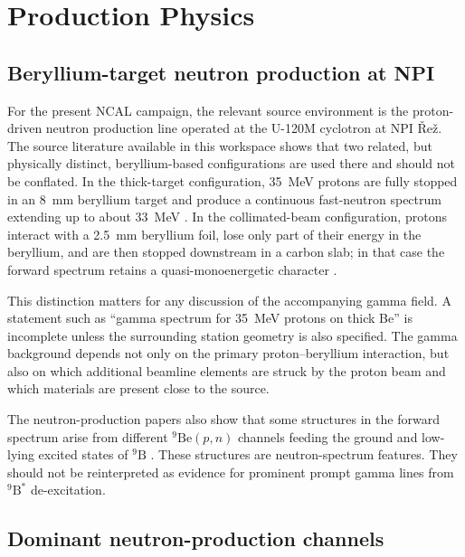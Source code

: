 \chapter{Production Physics}

\section{Beryllium-target neutron production at NPI}

For the present NCAL campaign, the relevant source environment is the proton-driven neutron production line operated at the U-120M cyclotron at NPI \v{R}e\v{z}. The source literature available in this workspace shows that two related, but physically distinct, beryllium-based configurations are used there and should not be conflated. In the thick-target configuration, \SI{35}{MeV} protons are fully stopped in an \SI{8}{mm} beryllium target and produce a continuous fast-neutron spectrum extending up to about \SI{33}{MeV} \citep{Majerle2023PBeGenerator}. In the collimated-beam configuration, protons interact with a \SI{2.5}{mm} beryllium foil, lose only part of their energy in the beryllium, and are then stopped downstream in a carbon slab; in that case the forward spectrum retains a quasi-monoenergetic character \citep{Ansorge2025CollimatedBeams}.

This distinction matters for any discussion of the accompanying gamma field. A statement such as ``gamma spectrum for \SI{35}{MeV} protons on thick Be'' is incomplete unless the surrounding station geometry is also specified. The gamma background depends not only on the primary proton--beryllium interaction, but also on which additional beamline elements are struck by the proton beam and which materials are present close to the source.

The neutron-production papers also show that some structures in the forward spectrum arise from different \(^{9}\mathrm{Be}(p,n)\) channels feeding the ground and low-lying excited states of \(^{9}\mathrm{B}\) \citep{Ansorge2025CollimatedBeams,Majerle2023PBeGenerator}. These structures are neutron-spectrum features. They should not be reinterpreted as evidence for prominent prompt gamma lines from \(^{9}\mathrm{B}^{*}\) de-excitation.

\section{Dominant neutron-production channels}

